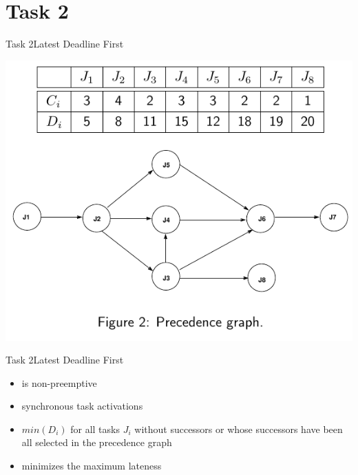 
\section{Task 2}

\setcounter{task}{1}

\begin{frame}[shrink=10]{Task 2}{Latest Deadline First}
  \vspace{0.5cm}
  \begin{task}
    \centering
    \includegraphics[height=0.7\paperheight]{./figures/2_tab_graph.png}
  \end{task}
\end{frame}

\begin{frame}{Task 2}{Latest Deadline First}
  \begin{requirements}
    \begin{itemize}
      \item is \alert{non-preemptive}
      \item \alert{synchronous task activations}
      \item $min(D_i)$ for all tasks $J_i$ without successors or whose successors have been all selected in the \alert{precedence graph}
      \item \alert{minimizes} the \alert{maximum lateness}
    \end{itemize}
  \end{requirements}
\end{frame}

